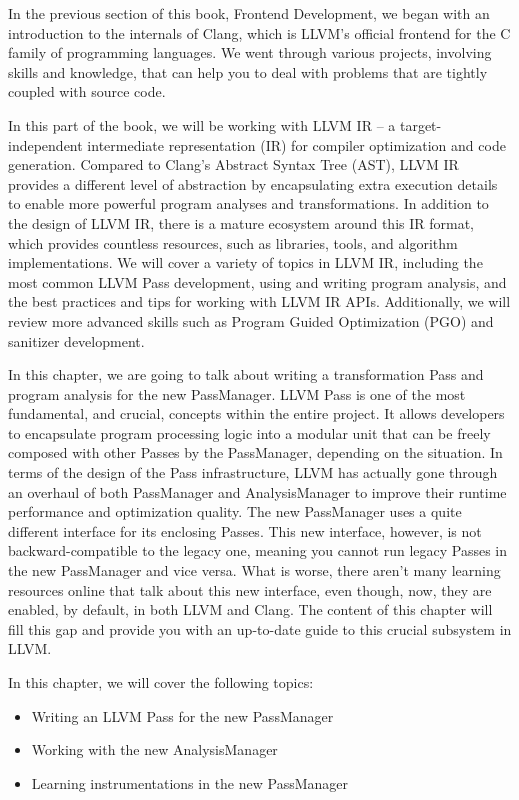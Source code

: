 In the previous section of this book, Frontend Development, we began with an introduction to the internals of Clang, which is LLVM's official frontend for the C family of programming languages. We went through various projects, involving skills and knowledge, that can help you to deal with problems that are tightly coupled with source code.

In this part of the book, we will be working with LLVM IR – a target-independent intermediate representation (IR) for compiler optimization and code generation. Compared to Clang's Abstract Syntax Tree (AST), LLVM IR provides a different level of abstraction by encapsulating extra execution details to enable more powerful program analyses and transformations. In addition to the design of LLVM IR, there is a mature ecosystem around this IR format, which provides countless resources, such as libraries, tools, and algorithm implementations. We will cover a variety of topics in LLVM IR, including the most common LLVM Pass development, using and writing program analysis, and the best practices and tips for working with LLVM IR APIs. Additionally, we will review more advanced skills such as Program Guided Optimization (PGO) and sanitizer development.

In this chapter, we are going to talk about writing a transformation Pass and program analysis for the new PassManager. LLVM Pass is one of the most fundamental, and crucial, concepts within the entire project. It allows developers to encapsulate program processing logic into a modular unit that can be freely composed with other Passes by the PassManager, depending on the situation. In terms of the design of the Pass infrastructure, LLVM has actually gone through an overhaul of both PassManager and AnalysisManager to improve their runtime performance and optimization quality. The new PassManager uses a quite different interface for its enclosing Passes. This new interface, however, is not backward-compatible to the legacy one, meaning you cannot run legacy Passes in the new PassManager and vice versa. What is worse, there aren't many learning resources online that talk about this new interface, even though, now, they are enabled, by default, in both LLVM and Clang. The content of this chapter will fill this gap and provide you with an up-to-date guide to this crucial subsystem in LLVM.

In this chapter, we will cover the following topics:

\begin{itemize}
\item Writing an LLVM Pass for the new PassManager
\item Working with the new AnalysisManager
\item Learning instrumentations in the new PassManager
\end{itemize}


